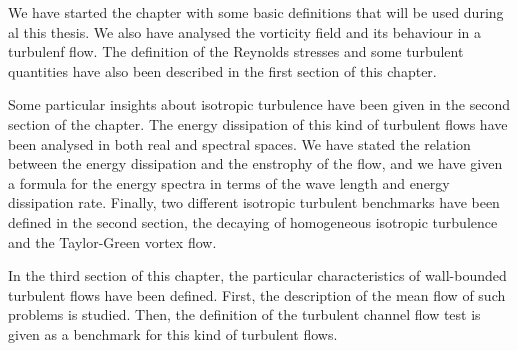 We have started the chapter with some basic definitions that will be used during al this thesis. We also have analysed the vorticity field and its behaviour in a turbulenf flow. The definition of the Reynolds stresses and some turbulent quantities have also been described in the first section of this chapter.

Some particular insights about isotropic turbulence have been given in the second section of the chapter. The energy dissipation of this kind of turbulent flows have been analysed in both real and spectral spaces. We have stated the relation between the energy dissipation and the enstrophy of the flow, and we have given a formula for the energy spectra in terms of the wave length and energy dissipation rate. Finally, two different isotropic turbulent benchmarks have been defined in the second section, the decaying of homogeneous isotropic turbulence and the Taylor-Green vortex flow.

In the third section of this chapter, the particular characteristics of wall-bounded turbulent flows have been defined. First, the description of the mean flow of such problems is studied. Then, the definition of the turbulent channel flow test is given as a benchmark for this kind of turbulent flows.
